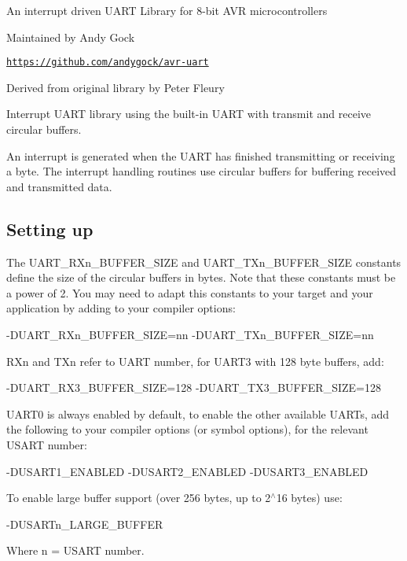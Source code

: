 An interrupt driven U\+A\+R\+T Library for 8-\/bit A\+V\+R microcontrollers

Maintained by Andy Gock

\href{https://github.com/andygock/avr-uart}{\tt https\+://github.\+com/andygock/avr-\/uart}

Derived from original library by Peter Fleury

Interrupt U\+A\+R\+T library using the built-\/in U\+A\+R\+T with transmit and receive circular buffers.

An interrupt is generated when the U\+A\+R\+T has finished transmitting or receiving a byte. The interrupt handling routines use circular buffers for buffering received and transmitted data.

\subsection*{Setting up}

The {\ttfamily U\+A\+R\+T\+\_\+\+R\+Xn\+\_\+\+B\+U\+F\+F\+E\+R\+\_\+\+S\+I\+Z\+E} and {\ttfamily U\+A\+R\+T\+\_\+\+T\+Xn\+\_\+\+B\+U\+F\+F\+E\+R\+\_\+\+S\+I\+Z\+E} constants define the size of the circular buffers in bytes. Note that these constants must be a power of 2. You may need to adapt this constants to your target and your application by adding to your compiler options\+: \begin{DoxyVerb}-DUART_RXn_BUFFER_SIZE=nn -DUART_TXn_BUFFER_SIZE=nn
\end{DoxyVerb}


{\ttfamily R\+Xn} and {\ttfamily T\+Xn} refer to U\+A\+R\+T number, for U\+A\+R\+T3 with 128 byte buffers, add\+: \begin{DoxyVerb}-DUART_RX3_BUFFER_SIZE=128 -DUART_TX3_BUFFER_SIZE=128
\end{DoxyVerb}


U\+A\+R\+T0 is always enabled by default, to enable the other available U\+A\+R\+Ts, add the following to your compiler options (or symbol options), for the relevant U\+S\+A\+R\+T number\+: \begin{DoxyVerb}-DUSART1_ENABLED -DUSART2_ENABLED -DUSART3_ENABLED
\end{DoxyVerb}


To enable large buffer support (over 256 bytes, up to 2$^\wedge$16 bytes) use\+: \begin{DoxyVerb}-DUSARTn_LARGE_BUFFER
\end{DoxyVerb}


Where n = U\+S\+A\+R\+T number.

